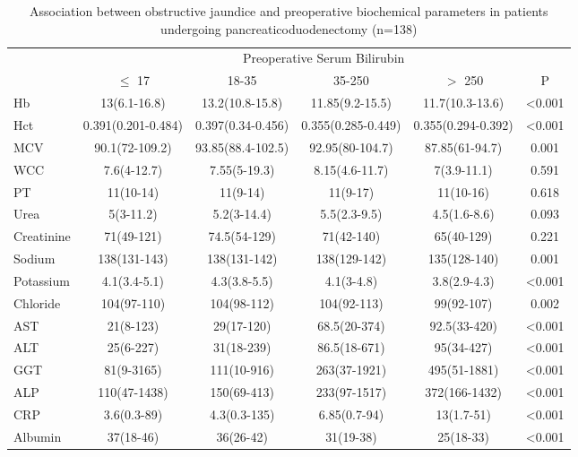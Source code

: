 	\begin{sidewaystable}[p]
		\caption{Association between obstructive jaundice and preoperative biochemical parameters in patients undergoing pancreaticoduodenectomy (n=138)}
		\label{table:cpet_oj_table2}
		\centering
		\renewcommand{\arraystretch}{1.4} %
		\setlength{\tabcolsep}{9pt} %
		
		\begin{tabular}{l c c c c c}
			\hline
			           &                     \multicolumn{5}{c}{Preoperative Serum Bilirubin}                      \\
			           & $\leq$ 17          & 18-35             & 35-250             & $>$ 250            & P      \\ \hline
			Hb         & 13(6.1-16.8)       & 13.2(10.8-15.8)   & 11.85(9.2-15.5)    & 11.7(10.3-13.6)    & <0.001 \\
			Hct        & 0.391(0.201-0.484) & 0.397(0.34-0.456) & 0.355(0.285-0.449) & 0.355(0.294-0.392) & <0.001 \\
			MCV        & 90.1(72-109.2)     & 93.85(88.4-102.5) & 92.95(80-104.7)    & 87.85(61-94.7)     & 0.001  \\
			WCC        & 7.6(4-12.7)        & 7.55(5-19.3)      & 8.15(4.6-11.7)     & 7(3.9-11.1)        & 0.591  \\
			PT         & 11(10-14)          & 11(9-14)          & 11(9-17)           & 11(10-16)          & 0.618  \\
			Urea       & 5(3-11.2)          & 5.2(3-14.4)       & 5.5(2.3-9.5)       & 4.5(1.6-8.6)       & 0.093  \\
			Creatinine & 71(49-121)         & 74.5(54-129)      & 71(42-140)         & 65(40-129)         & 0.221  \\
			Sodium     & 138(131-143)       & 138(131-142)      & 138(129-142)       & 135(128-140)       & 0.001  \\
			Potassium  & 4.1(3.4-5.1)       & 4.3(3.8-5.5)      & 4.1(3-4.8)         & 3.8(2.9-4.3)       & <0.001 \\
			Chloride   & 104(97-110)        & 104(98-112)       & 104(92-113)        & 99(92-107)         & 0.002  \\
			AST        & 21(8-123)          & 29(17-120)        & 68.5(20-374)       & 92.5(33-420)       & <0.001 \\
			ALT        & 25(6-227)          & 31(18-239)        & 86.5(18-671)       & 95(34-427)         & <0.001 \\
			GGT        & 81(9-3165)         & 111(10-916)       & 263(37-1921)       & 495(51-1881)       & <0.001 \\
			ALP        & 110(47-1438)       & 150(69-413)       & 233(97-1517)       & 372(166-1432)      & <0.001 \\
			CRP        & 3.6(0.3-89)        & 4.3(0.3-135)      & 6.85(0.7-94)       & 13(1.7-51)         & <0.001 \\
			Albumin    & 37(18-46)          & 36(26-42)         & 31(19-38)          & 25(18-33)          & <0.001 \\ \hline
		\end{tabular}
	\end{sidewaystable}